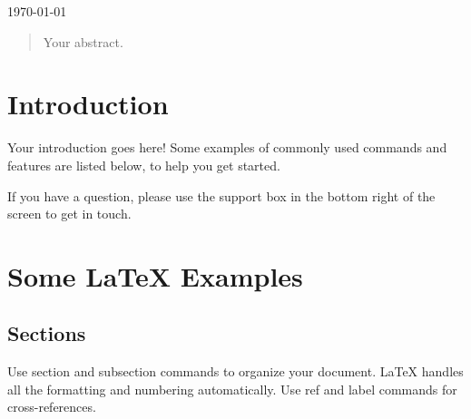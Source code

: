 \begin{titlepage}
		
		{\large \today}\\[2cm] %
		
		
		
		
		\vfill %
		
	\end{titlepage}
	
	
	\begin{abstract}
		Your abstract.
	\end{abstract}
	
	\section{Introduction}
	
	Your introduction goes here! Some examples of commonly used commands and features are listed below, to help you get started.
	
	If you have a question, please use the support box in the bottom right of the screen to get in touch. 
	
	\section{Some \LaTeX{} Examples}
	\label{sec:examples}
	
	\subsection{Sections}
	
	Use section and subsection commands to organize your document. \LaTeX{} handles all the formatting and numbering automatically. Use ref and label commands for cross-references.
	
